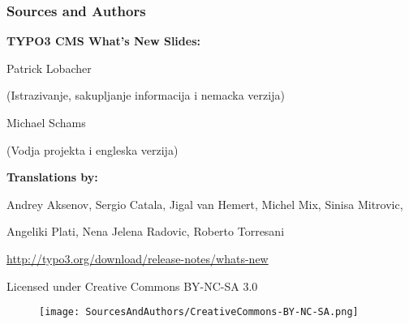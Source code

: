 \begin{frame}[fragile]
	\frametitle{Sources and Authors}

	\vspace{-0.6cm}

	\centerline{\textbf{TYPO3 CMS What's New Slides:}}

	\begin{center}
		\smaller
			\centerline{Patrick Lobacher}
			\centerline{(Istrazivanje, sakupljanje informacija i nemacka verzija)}
			\vspace{0.1cm}
			\centerline{Michael Schams}
			\centerline{(Vodja projekta i engleska verzija)}
		\normalsize
	\end{center}
	\vspace{-0.6cm}
	\begin{center}
		\smaller
			\centerline{\textbf{Translations by:}}
			\centerline{Andrey Aksenov, Sergio Catala, Jigal van Hemert, Michel Mix, Sinisa Mitrovic,}
			\centerline{Angeliki Plati, Nena Jelena Radovic, Roberto Torresani}
		\normalsize
	\end{center}
	\vspace{-0.6cm}
	\smaller\begin{center}\url{http://typo3.org/download/release-notes/whats-new}\end{center}\normalsize

	\smaller\begin{center}Licensed under Creative Commons BY-NC-SA 3.0\end{center}\normalsize
	\begin{figure}\vspace*{-0.3cm}
		\texttt{[image: SourcesAndAuthors/CreativeCommons-BY-NC-SA.png]}
	\end{figure}

\end{frame}

